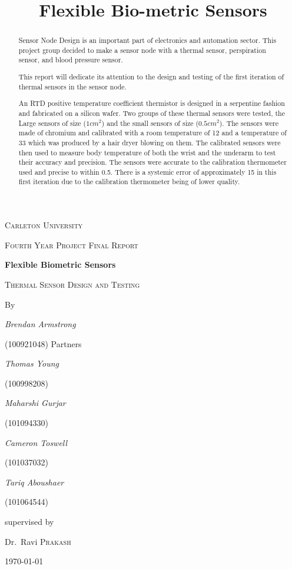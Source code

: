 \documentclass[12pt,a4paper]{report}
\begin{document}
\begin{titlepage}
\title{Flexible Bio-metric Sensors}
\centering
{\scshape Carleton University \par}
\vspace{1cm}
{\scshape Fourth Year Project Final Report\par}
\vspace{1.5cm}
{\huge\bfseries Flexible Biometric Sensors\par}
\vspace{2cm}
   
{\scshape\Large Thermal Sensor Design and Testing\par}   
    By
    
{\Large\itshape Brendan Armstrong\par}
    (100921048)
    \vfill
    Partners
    
    {\large\itshape Thomas Young \par}
    (100998208)
    
    {\large\itshape Maharshi Gurjar\par}
    (101094330)
    
    {\large\itshape Cameron Toswell\par}
    (101037032)
    
    {\large\itshape Tariq Aboushaer\par}
    (101064544)
    
\vfill
supervised by\par
Dr.~Ravi \textsc{Prakash}

\vfill

{\large \today\par}
\end{titlepage}

\begin{abstract}
    Sensor Node Design is an important part of electronics and automation sector. This project group decided to make a sensor node with a thermal sensor, perspiration sensor, and blood pressure sensor. \par
    This report will dedicate its attention to the design and testing of the first iteration of thermal sensors in the sensor node.
    \par
    An RTD positive temperature coefficient thermistor is designed in a serpentine fashion and fabricated on a silicon wafer. Two groups of these thermal sensors were tested, the Large sensors of size ($1cm^2$) and the small sensors of size ($0.5cm^2$). The sensors were made of chromium and calibrated with a room temperature of 12\textcelsius{} and a temperature of 33\textcelsius{} which was produced by a hair dryer blowing on them. The calibrated sensors were then used to measure body temperature of both the wrist and the underarm to test their accuracy and precision. The sensors were accurate to the calibration thermometer used and precise to within 0.5\textcelsius{}. There is a systemic error of approximately 15\textcelsius{} in this first iteration due to the calibration thermometer being of lower quality.
\end{abstract}
\end{document}

